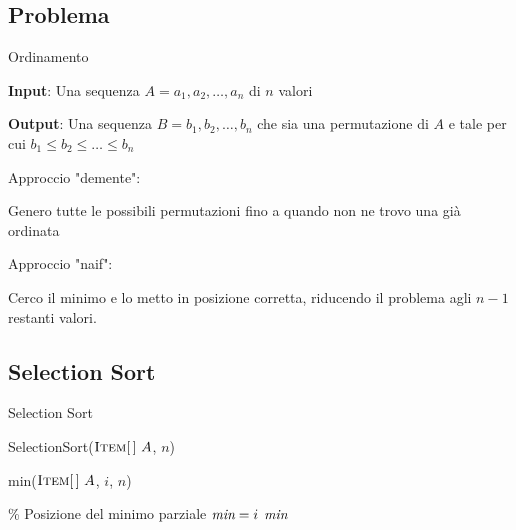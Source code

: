 \subsection{Problema}

\begin{frame}{Ordinamento}
\begin{myboxtitle}
\BI
\item \textbf{Input}: Una sequenza $A= a_1, a_2, \ldots, a_n$ di $n$ valori
\item \textbf{Output}: Una sequenza $B= b_1, b_2, \ldots, b_n$ che sia una permutazione di $A$ e tale per cui $b_1 \leq b_2 \leq \ldots \leq b_n$ 
\EI
\end{myboxtitle}

\bigskip
Approccio "demente":
\BI
\item Genero tutte le possibili permutazioni fino a quando non ne trovo una già ordinata
\EI

\bigskip\pause
Approccio "naif":
\BI
\item Cerco il minimo e lo metto in posizione corretta, riducendo il problema agli $n-1$ restanti valori.
\EI

\end{frame}

\subsection{Selection Sort}

\begin{frame}{Selection Sort}

\vspace{-6pt}
\begin{Procedure}
\caption[A]{\textsf{SelectionSort}($\textsc{Item}[\,]\ A$, \INTEGER $n$)}
\end{Procedure}

\vspace{-12pt}
\begin{Procedure}
\caption[A]{\INTEGER \textsf{min}($\textsc{Item}[\,]\ A$, \INTEGER $i$, \INTEGER $n$)}{
  \% Posizione del minimo parziale\;
  \INTEGER $\textit{min} = i$\;
  {
  }
  \Return $\textit{min}$
}
\end{Procedure}
\end{frame}



